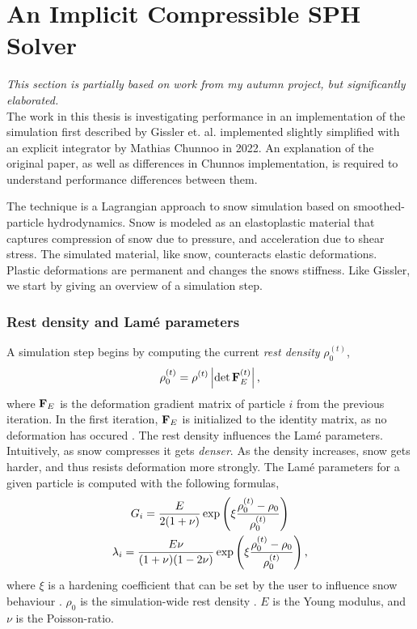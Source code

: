 \section{An Implicit Compressible SPH Solver}
\label{sec:icsph}
\textit{This section is partially based on work from my autumn
project, but significantly elaborated.}\\[.05em]

\noindent
The work in this thesis is investigating performance in an implementation of
the simulation first described by Gissler et. al. \cite{icsph} implemented
slightly simplified with an explicit integrator by Mathias Chunnoo 
\cite{chunnoo2022simulating} in 2022.
An explanation of the original paper, as well as differences in Chunnos implementation,
is required to understand performance differences between them.

The technique is a Lagrangian approach to snow simulation based on smoothed-particle
hydrodynamics.
Snow is modeled as an elastoplastic material that captures compression of snow due to
pressure, and acceleration due to shear stress.
The simulated material, like snow, counteracts elastic deformations.
Plastic deformations are permanent and changes the snows stiffness.
Like Gissler, we start by giving an overview of a simulation step.

\subsubsection*{Rest density and Lamé parameters}
A simulation step begins by computing the current {\em rest density} $\rho^{(t)}_{0}$,
\begin{equation}
    \label{eq:rho_0}
    \rho_{0}^{(t)} = \rho^{(t)} \left\lvert \det \bm{\mathrm F}^{(t)}_{E}\right\rvert \text,
\end{equation}
where $\bm{\mathrm F}_{E}$ is the deformation gradient matrix of particle $i$ from the previous
iteration.
In the first iteration, $\bm{\mathrm F}_E$ is initialized to the identity matrix, as no deformation
has occured \cite{citation needed}.
The rest density influences the Lamé parameters. Intuitively, as snow compresses it
gets {\em denser}.
As the density increases, snow gets harder, and thus resists deformation more strongly.
The Lamé parameters for a given particle is computed with the following formulas,
\begin{equation}
    \label{eg:lame-parameters}
    \begin{gathered}
        G_i         = \frac E {2(1+\nu)} 
                        \exp \left( \xi \frac {\rho_{0}^{(t)} - \rho_0} {\rho_{0}^{(t)}} \right) \\
        \lambda_i   = \frac {E\nu} {(1+\nu)(1-2\nu)}
                        \exp \left( \xi \frac {\rho_{0}^{(t)} - \rho_0} {\rho_{0}^{(t)}} \right)  \text,
    \end{gathered}
\end{equation}
where $\xi$ is a hardening coefficient that can be set by the user to influence snow behaviour
\cite{icsph}.
$\rho_0$ is the simulation-wide rest density \cite{chunnoo2022simulating}.
$E$ is the Young modulus, and $\nu$ is the Poisson-ratio.

